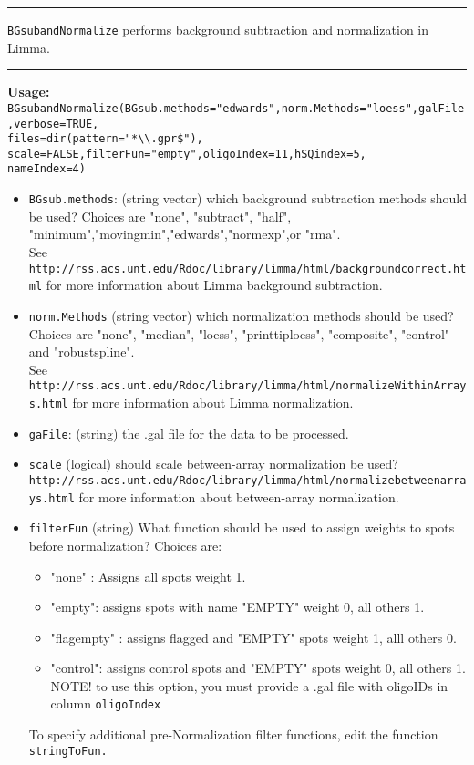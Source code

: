 \documentclass[10pt]{article}
\begin{document}
  \rule{\linewidth}{0.4pt}
  \texttt{BGsubandNormalize} \hspace{1in} performs background subtraction and normalization in Limma.\\
    \rule{\linewidth}{0.4pt}
\textbf{Usage:}\\
\texttt{BGsubandNormalize(BGsub.methods="edwards",norm.Methods="loess",galFile,verbose=TRUE, \\ \indent files=dir(pattern="*\textbackslash\textbackslash.gpr\$"),
                            scale=FALSE,filterFun="empty",oligoIndex=11,hSQindex=5,\\ \indent nameIndex=4)}\\
\begin{itemize}
    	\item \texttt{BGsub.methods}: (string vector) which background subtraction methods should be used? Choices are "none", "subtract", "half", "minimum","movingmin","edwards","normexp",or "rma".\\ See \texttt{http://rss.acs.unt.edu/Rdoc/library/limma/html/backgroundcorrect.html} for more information about Limma background subtraction.
     	\item \texttt{norm.Methods} (string vector) which normalization methods should be used? Choices are "none", "median", "loess", "printtiploess", "composite", "control" and "robustspline".  \\See \texttt{http://rss.acs.unt.edu/Rdoc/library/limma/html/normalizeWithinArrays.html} for more information about Limma normalization.
     	\item \texttt{gaFile}: (string) the .gal file for the data to be processed.
     	\item \texttt{scale} (logical) should scale between-array normalization be used? \\ \texttt{http://rss.acs.unt.edu/Rdoc/library/limma/html/normalizebetweenarrays.html} for more information about between-array normalization. 
     	 \item \texttt{filterFun} (string) What function should be used to assign weights to spots before normalization? Choices are: \begin{itemize}\item "none" : Assigns all spots weight 1. 
\item "empty": assigns spots with name "EMPTY" weight 0, all others 1. 
\item "flagempty" : assigns flagged and "EMPTY" spots weight 1, alll others 0. 
\item "control": assigns control spots and "EMPTY" spots weight 0, all others 1. NOTE! to use this option, you must provide a .gal file with oligoIDs in column \texttt{oligoIndex}\end{itemize} To specify additional pre-Normalization filter functions, edit the function \texttt{stringToFun.} 
     


\end{itemize}
\end{document}

